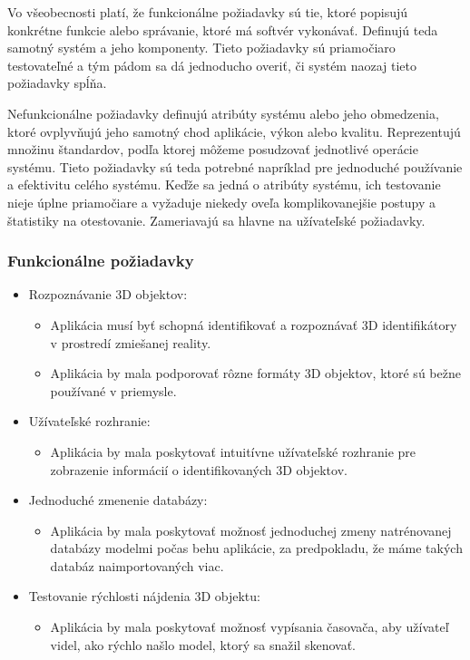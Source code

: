 Vo všeobecnosti platí, že funkcionálne požiadavky sú tie, ktoré popisujú konkrétne funkcie alebo správanie, ktoré má softvér vykonávať. Definujú teda samotný systém a jeho komponenty. Tieto požiadavky sú priamočiaro testovateľné a tým pádom sa dá jednoducho overiť, či systém naozaj tieto požiadavky spĺňa.

Nefunkcionálne požiadavky definujú atribúty systému alebo jeho obmedzenia, ktoré ovplyvňujú jeho samotný chod aplikácie, výkon alebo kvalitu. Reprezentujú množinu štandardov, podľa ktorej môžeme posudzovať jednotlivé operácie systému. Tieto požiadavky sú teda potrebné napríklad pre jednoduché používanie a efektivitu celého systému. Keďže sa jedná o atribúty systému, ich testovanie nieje úplne priamočiare a vyžaduje niekedy oveľa komplikovanejšie postupy a štatistiky na otestovanie. Zameriavajú sa hlavne na užívateľské požiadavky.

\subsubsection{Funkcionálne požiadavky}

\begin{itemize}
    \item Rozpoznávanie 3D objektov:
    \begin{itemize}
        \item Aplikácia musí byť schopná identifikovať a rozpoznávať 3D identifikátory v prostredí zmiešanej reality.
        \item Aplikácia by mala podporovať rôzne formáty 3D objektov, ktoré sú bežne používané v priemysle.
    \end{itemize}
    \item Užívateľské rozhranie:
    \begin{itemize}
        \item Aplikácia by mala poskytovať intuitívne užívateľské rozhranie pre zobrazenie informácií o identifikovaných 3D objektov.
    \end{itemize}
    \item Jednoduché zmenenie databázy:
    \begin{itemize}
        \item Aplikácia by mala poskytovať možnosť jednoduchej zmeny natrénovanej databázy modelmi počas behu aplikácie, za predpokladu, že máme takých databáz naimportovaných viac.
    \end{itemize}
    \item Testovanie rýchlosti nájdenia 3D objektu:
    \begin{itemize}
        \item Aplikácia by mala poskytovať možnosť vypísania časovača, aby užívateľ videl, ako rýchlo našlo model, ktorý sa snažil skenovať.
    \end{itemize}
\end{itemize}

